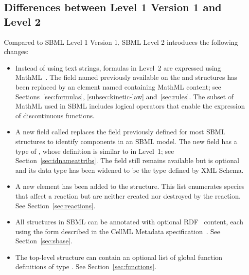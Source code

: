 \documentclass[10pt,twocolumntoc]{cekarticle}
\begin{document}
\subsection{Differences between Level 1 Version 1 and Level 2}

Compared to SBML Level 1 Version 1, SBML Level 2 introduces the following
changes: 
\begin{itemize}
  
\item Instead of using text strings, formulas in Level~2 are expressed
  using MathML~\citep{w3c:2000b}.  The field named 
  previously available on the  and 
  structures has been replaced by an element named  containing
  MathML content; see Sections~\ref{sec:formulas}, \ref{subsec:kinetic-law}
  and~\ref{sec:rules}.  The subset of MathML used in SBML includes logical
  operators that enable the expression of discontinuous functions.
  
\item A new field called  replaces the  field
  previously defined for most SBML structures to identify components in an
  SBML model.  The new  field has a type of , whose
  definition is similar to  in Level~1; see
  Section~\ref{sec:idnameattribs}.  The  field still remains
  available but is optional and its data type has been widened to be the
   type defined by XML Schema.
  
\item A new  element has been added to the
   structure.  This list enumerates species that affect a
  reaction but are neither created nor destroyed by the reaction.  See
  Section~\ref{sec:reactions}.
  
\item All structures in SBML can be annotated with optional
  RDF~\citep{lassila:1999} content, each using the form described in the
  CellML Metadata specification~\citep{cuellar:2002}.  See
  Section~\ref{sec:sbase}.
  
\item The top-level  structure can contain an optional list of
  global function definitions of type .  See
  Section~\ref{sec:functions}.
  

\end{itemize}
\end{document}
